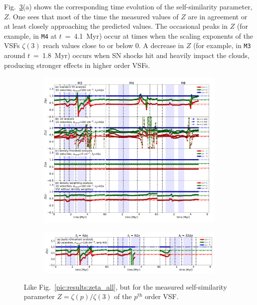 \documentclass{aa}		%
\begin{document}
Fig.~\ref{pic:results:z_all}(a) shows the corresponding time evolution of the self-similarity parameter, $Z$. 
One sees that most of the time the measured values of $Z$ are in agreement or at least closely approaching the predicted values. 
The occasional peaks in $Z$ (for example, in \texttt{M4} at $t$~=~4.1~Myr) occur at times when the scaling exponents of the VSFs $\zeta(3)$ reach values close to or below 0.
A decrease in $Z$ (for example, in \texttt{M3} around $t$~=~1.8~Myr) occurs when SN shocks hit and heavily impact the clouds, producing stronger effects in higher order VSFs.

\begin{figure}[!htb]
	\centering  
  
  \begin{subfigure}[c]{\textwidth}
      \includegraphics[width=\textwidth]{z_all_nojeans.pdf}
      \label{pic:results:z_all_nojeans}
  \end{subfigure}
  
  \begin{subfigure}[c]{\textwidth}
      \addtocounter{subfigure}{4}
      \includegraphics[width=\textwidth]{z_jeans.pdf}
      \label{pic:results:z_all_jeans}
  \end{subfigure}
  
  \caption{Like Fig.~\ref{pic:results:zeta_all}, but for the measured self-similarity parameter $Z = \zeta(p) / \zeta(3)$ of the $p^\mathrm{th}$ order VSF.}
	\label{pic:results:z_all}
\end{figure}
\end{document}
